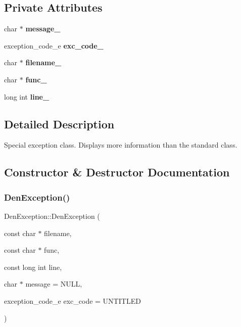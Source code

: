 \subsection*{Private Attributes}
\begin{DoxyCompactItemize}
\item 
\mbox{\label{classDenException_ac00d70d94b80bee04c3bd1001dcb9b59}} 
char $\ast$ {\bfseries message\+\_\+}
\item 
\mbox{\label{classDenException_a208f77c9eef3ca77c9856d53d61f6521}} 
exception\+\_\+code\+\_\+e {\bfseries exc\+\_\+code\+\_\+}
\item 
\mbox{\label{classDenException_af1a100cc67470e358b9f372cbc157830}} 
char $\ast$ {\bfseries filename\+\_\+}
\item 
\mbox{\label{classDenException_abbaa230a9b0fe68e0ef7eaad171f79a4}} 
char $\ast$ {\bfseries func\+\_\+}
\item 
\mbox{\label{classDenException_a5b7be04f7a34c9944e0d0e934e88ef26}} 
long int {\bfseries line\+\_\+}
\end{DoxyCompactItemize}


\subsection{Detailed Description}
Special exception class. Displays more information than the standard class. 

\subsection{Constructor \& Destructor Documentation}
\mbox{\label{classDenException_a8ae37243a8123f2b42fecc82b0953e6c}} 
\subsubsection{\texorpdfstring{Den\+Exception()}{DenException()}\hspace{0.1cm}{\footnotesize\ttfamily [1/3]}}
{\footnotesize\ttfamily Den\+Exception\+::\+Den\+Exception (\begin{DoxyParamCaption}\item[{const char $\ast$}]{filename,  }\item[{const char $\ast$}]{func,  }\item[{const long int}]{line,  }\item[{char $\ast$}]{message = {\ttfamily NULL},  }\item[{exception\+\_\+code\+\_\+e}]{exc\+\_\+code = {\ttfamily UNTITLED} }\end{DoxyParamCaption})}




